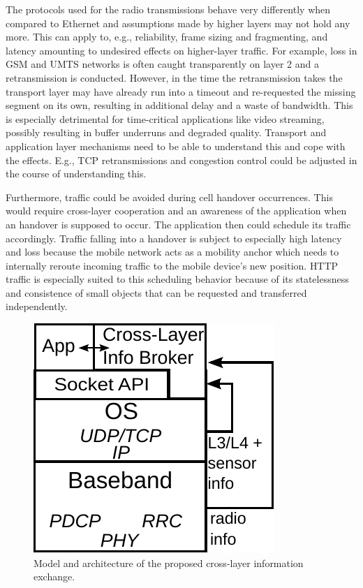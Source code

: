 
The protocols used for the radio transmissions behave very differently when compared to Ethernet and assumptions made by higher layers may not hold any more. This can apply to, e.g., reliability, frame sizing and fragmenting, and latency amounting to undesired effects on higher-layer traffic. For example, loss in \gls{GSM} and \gls{UMTS} networks is often caught transparently on layer 2 and a retransmission is conducted. However, in the time the retransmission takes the transport layer may have already run into a timeout and re-requested the missing segment on its own, resulting in additional delay and a waste of bandwidth. This is especially detrimental for time-critical applications like video streaming, possibly resulting in buffer underruns and degraded quality. Transport and application layer mechanisms need to be able to understand this and cope with the effects. E.g., \gls{TCP} retransmissions and congestion control could be adjusted in the course of understanding this.

Furthermore, traffic could be avoided during cell handover occurrences. This would require cross-layer cooperation and an awareness of the application when an handover is supposed to occur. The application then could schedule its traffic accordingly. Traffic falling into a handover is subject to especially high latency and loss because the mobile network acts as a mobility anchor which needs to internally reroute incoming traffic to the mobile device's new position. \gls{HTTP} traffic is especially suited to this scheduling behavior because of its statelessness and consistence of small objects that can be requested and transferred independently.

\begin{figure}[htb]
	\centering
	\includegraphics{images/cross-layer-model.pdf}
	\caption{Model and architecture of the proposed cross-layer information exchange.}
\label{c5:fig:crosslayer-model}
\end{figure}


